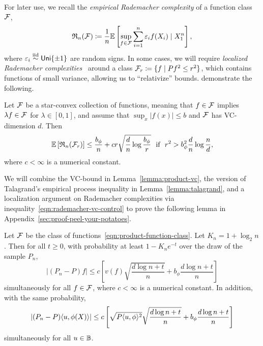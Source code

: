 \documentclass[11pt]{article}
\newcommand{\radphi}{b_{\phi}}
\begin{document}
For later use, we
recall the \emph{empirical Rademacher complexity} of a function class
$\mathcal{F}$,
\begin{equation*}
  \mathfrak{R}_n(\mathcal{F})
  \coloneqq \frac{1}{n} \mathbb{E}\left[\sup_{f \in \mathcal{F}}
    \sum_{i = 1}^n \varepsilon_i f(X_i) \mid X_1^n\right],
\end{equation*}
where $\varepsilon_i \stackrel{\rm iid}{\sim} \mathsf{Uni}\{\pm 1\}$ are random signs.
%
In some cases, we will require \emph{localized Rademacher
complexities}~\cite{BartlettBoMe05, Koltchinskii06a} around
a class $\mathcal{F}_r \coloneqq \{f \mid Pf^2 \le r^2\}$, which
contains functions of small variance, allowing us to ``relativize''
bounds.
%
\citet[Proof of Corollary 3.7]{BartlettBoMe05} demonstrate the following.
\begin{lemma}
  Let $\mathcal{F}$ be a star-convex collection of functions,
  meaning that $f \in \mathcal{F}$ implies $\lambda f \in \mathcal{F}$
  for $\lambda \in [0, 1]$, and assume that $\sup_x |f(x)| \le b$
  and $\mathcal{F}$ has VC-dimension $d$. Then
  \begin{equation}
    \label{eqn:rademacher-vc-control}
    \E\left[\rademacher_n(\mc{F}_r)\right]
    \le \frac{\radphi}{n} + 
    c r \sqrt{\frac{d}{n} \log\frac{\radphi}{r}}
    ~~ \mbox{if}~~
    r^2 > \radphi^2 \frac{d}{n} \log \frac{n}{d},
  \end{equation}
  where $c < \infty$ is a numerical constant.  
\end{lemma}


We will combine the VC-bound in Lemma~\ref{lemma:product-vc},
the version of
Talagrand's empirical process inequality in Lemma~\ref{lemma:talagrand}, and
a localization argument on Rademacher complexities
via inequality~\eqref{eqn:rademacher-vc-control}
to prove the following lemma in Appendix~\ref{sec:proof-peel-your-potatoes}.
\begin{lemma}
  \label{lemma:peel-your-potatoes}
  Let $\mathcal{F}$ be the class of functions~\eqref{eqn:product-function-class}.
  Let $K_n = 1 + \log_2 n$. Then
  for all $t \ge 0$, with probability at least
  $1 - K_n e^{-t}$ over the draw of the sample $P_n$,
  \begin{equation*}
    |(P_n - P) f|
    \le c \left[v(f) \sqrt{\frac{d \log n + t}{n}}
    + \radphi \frac{d \log n + t}{n}\right]
  \end{equation*}
  simultaneously for all $f \in \mathcal{F}$, where $c < \infty$ is a numerical
  constant.
  In addition, with the same probability,
  \begin{equation*}
    \left|(P_n - P)\<u, \phi(X)\>\right|
    \le c \left[\sqrt{P \<u, \phi\>^2}
      \sqrt{\frac{d \log n + t}{n}}
      + \radphi \frac{d \log n + t}{n}
      \right]
  \end{equation*}
  simultaneously for all $u \in \mathbb{B}$.
\end{lemma}
\end{document}
